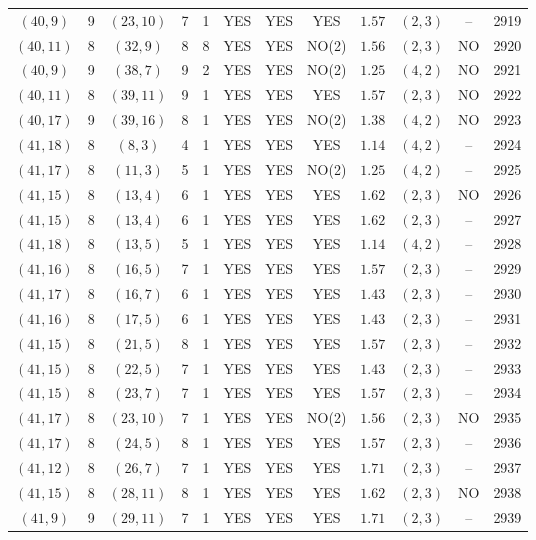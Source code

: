 \begin{longtable}{|c|c|c|c|c|c|c|c|c|c|c|c|}
$(40,9)$ & 9 & $(23,10)$ & 7 & 1 & YES & YES & YES & $1.57$ & $(2,3)$ & -- & 2919\\
$(40,11)$ & 8 & $(32,9)$ & 8 & 8 & YES & YES & NO(2) & $1.56$ & $(2,3)$ & NO & 2920\\
$(40,9)$ & 9 & $(38,7)$ & 9 & 2 & YES & YES & NO(2) & $1.25$ & $(4,2)$ & NO & 2921\\
$(40,11)$ & 8 & $(39,11)$ & 9 & 1 & YES & YES & YES & $1.57$ & $(2,3)$ & NO & 2922\\
$(40,17)$ & 9 & $(39,16)$ & 8 & 1 & YES & YES & NO(2) & $1.38$ & $(4,2)$ & NO & 2923\\
$(41,18)$ & 8 & $(8,3)$ & 4 & 1 & YES & YES & YES & $1.14$ & $(4,2)$ & -- & 2924\\
$(41,17)$ & 8 & $(11,3)$ & 5 & 1 & YES & YES & NO(2) & $1.25$ & $(4,2)$ & -- & 2925\\
$(41,15)$ & 8 & $(13,4)$ & 6 & 1 & YES & YES & YES & $1.62$ & $(2,3)$ & NO & 2926\\
$(41,15)$ & 8 & $(13,4)$ & 6 & 1 & YES & YES & YES & $1.62$ & $(2,3)$ & -- & 2927\\
$(41,18)$ & 8 & $(13,5)$ & 5 & 1 & YES & YES & YES & $1.14$ & $(4,2)$ & -- & 2928\\
$(41,16)$ & 8 & $(16,5)$ & 7 & 1 & YES & YES & YES & $1.57$ & $(2,3)$ & -- & 2929\\
$(41,17)$ & 8 & $(16,7)$ & 6 & 1 & YES & YES & YES & $1.43$ & $(2,3)$ & -- & 2930\\
$(41,16)$ & 8 & $(17,5)$ & 6 & 1 & YES & YES & YES & $1.43$ & $(2,3)$ & -- & 2931\\
$(41,15)$ & 8 & $(21,5)$ & 8 & 1 & YES & YES & YES & $1.57$ & $(2,3)$ & -- & 2932\\
$(41,15)$ & 8 & $(22,5)$ & 7 & 1 & YES & YES & YES & $1.43$ & $(2,3)$ & -- & 2933\\
$(41,15)$ & 8 & $(23,7)$ & 7 & 1 & YES & YES & YES & $1.57$ & $(2,3)$ & -- & 2934\\
$(41,17)$ & 8 & $(23,10)$ & 7 & 1 & YES & YES & NO(2) & $1.56$ & $(2,3)$ & NO & 2935\\
$(41,17)$ & 8 & $(24,5)$ & 8 & 1 & YES & YES & YES & $1.57$ & $(2,3)$ & -- & 2936\\
$(41,12)$ & 8 & $(26,7)$ & 7 & 1 & YES & YES & YES & $1.71$ & $(2,3)$ & -- & 2937\\
$(41,15)$ & 8 & $(28,11)$ & 8 & 1 & YES & YES & YES & $1.62$ & $(2,3)$ & NO & 2938\\
$(41,9)$ & 9 & $(29,11)$ & 7 & 1 & YES & YES & YES & $1.71$ & $(2,3)$ & -- & 2939\\

\end{longtable}
